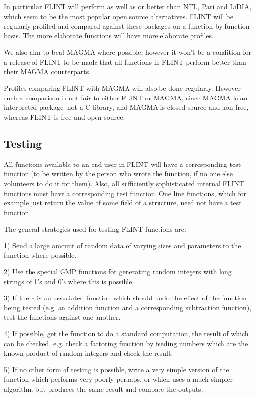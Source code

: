 \documentclass[a4paper,10pt]{article}
\begin{document}
In particular FLINT will perform as well as or better than NTL, Pari and LiDIA, which seem to be the most popular open source alternatives. FLINT will be regularly profiled and compared against these packages on a function by function basis. The more elaborate functions will have more elaborate profiles.

We also aim to beat MAGMA where possible, however it won't be a condition for a release of FLINT to be made that all functions in FLINT perform better than their MAGMA counterparts. 

Profiles comparing FLINT with MAGMA will also be done regularly. However such a comparison is not fair to either FLINT or MAGMA, since MAGMA is an interpreted package, not a C library, and MAGMA is closed source and non-free, whereas FLINT is free and open source.

\subsection{Testing}
All functions available to an end user in FLINT will have a corresponding test function (to be written by the person who wrote the function, if no one else volunteers to do it for them). Also, all sufficiently sophisticated internal FLINT functions must have a corresponding test function. One line functions, which for example just return the value of some field of a structure, need not have a test function.

The general strategies used for testing FLINT functions are:

1) Send a large amount of random data of varying sizes and parameters to the function where possible. 

2) Use the special GMP functions for generating random integers with long strings of 1's and 0's where this is possible.

3) If there is an associated function which should undo the effect of the function being tested (e.g. an addition function and a corresponding subtraction function), test the functions against one another.

4) If possible, get the function to do a standard computation, the result of which can be checked, e.g. check a factoring function by feeding numbers which are the known product of random integers and check the result. 

5) If no other form of testing is possible, write a very simple version of the function which performs very poorly perhaps, or which uses a much simpler algorithm but produces the same result and compare the outputs. 
\end{document}
